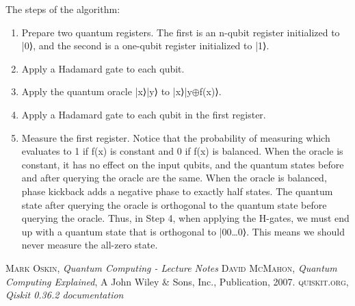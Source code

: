 \documentclass{article}
\begin{document}
The steps of the algorithm:
\begin{enumerate}[start=1]
\item Prepare two quantum registers. The first is an n-qubit register initialized to |0⟩, and the second is a one-qubit register initialized to |1⟩.
\item Apply a Hadamard gate to each qubit.
\item Apply the quantum oracle |x⟩|y⟩ to |x⟩|y$\oplus$f(x)⟩.
\item Apply a Hadamard gate to each qubit in the first register.
\item Measure the first register. Notice that the probability of measuring which evaluates to 1 if f(x) is constant and 0 if f(x) is balanced.
\newline
When the oracle is constant, it has no effect on the input qubits, and the quantum states before and after querying the oracle are the same. 
When the oracle is balanced, phase kickback adds a negative phase to exactly half states.
The quantum state after querying the oracle is orthogonal to the quantum state before querying the oracle. Thus, in Step 4, when applying the H-gates, we must end up with a quantum state that is orthogonal to |00…0⟩. This means we should never measure the all-zero state.
\end{enumerate}
\newpage
\begin{thebibliography}{x}
    {\scshape Mark Oskin}, {\itshape Quantum Computing - Lecture Notes}
    {\scshape David McMahon}, {\itshape Quantum Computing Explained}, A John Wiley \& Sons, Inc., Publication, 2007.
    {\scshape quiskit.org}, {\itshape Qiskit 0.36.2 documentation}
\end{thebibliography}
\end{document}
